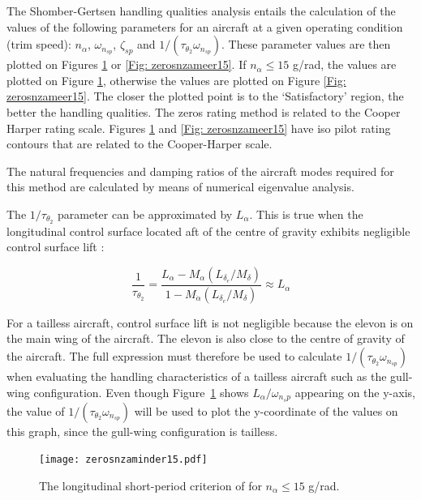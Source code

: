 \documentclass{report}
\begin{document}
The Shomber-Gertsen handling qualities analysis entails the calculation of the values of the following parameters for an aircraft at a given operating condition (trim speed):  $n_{\alpha}$, $\omega_{n_{sp}}$, $\zeta_{sp}$ and $1/(\tau_{\theta_2}\omega_{n_{sp}})$.  These parameter values are then plotted on Figures \ref{Fig: zerosnzaminder15} or \ref{Fig: zerosnzameer15}.  If $n_{\alpha} \le 15$ g/rad, the values are plotted on Figure \ref{Fig: zerosnzaminder15}, otherwise the values are plotted on Figure \ref{Fig: zerosnzameer15}.  The closer the plotted point is to the `Satisfactory' region, the better the handling qualities.  The zeros rating method is related to the Cooper Harper rating scale.  Figures \ref{Fig: zerosnzaminder15} and \ref{Fig: zerosnzameer15} have iso pilot rating contours that are related to the Cooper-Harper scale.

The natural frequencies and damping ratios of the aircraft modes required for this method are calculated by means of numerical eigenvalue analysis.

The $1/\tau_{\theta_2}$ parameter can be approximated by $L_\alpha$.  This is true when the longitudinal control surface located aft of the centre of gravity exhibits negligible control surface lift \citep{ZeroGertsen}:  

\begin{equation}
	\frac{1}{\tau_{\theta_2}} = \frac{L_\alpha - M_\alpha(L_{\delta_e}/M_\delta)}{1 - M_{\dot{\alpha}} (L_{\delta_e}/M_\delta)} \approx L_\alpha
\end{equation}

For a tailless aircraft, control surface lift is not negligible because the elevon is on the main wing of the aircraft.  The elevon is also close to the centre of gravity of the aircraft.  The full expression must therefore be used to calculate $1/(\tau_{\theta_2}\omega_{n_{sp}})$ when evaluating the handling characteristics of a tailless aircraft such as the gull-wing configuration.  Even though \mbox{Figure \ref{Fig: zerosnzaminder15}} shows $L_\alpha/\omega_{n_sp}$ appearing on the y-axis, the value of $1/(\tau_{\theta_2}\omega_{n_{sp}})$ will be used to plot the y-coordinate of the values on this graph, since the gull-wing configuration is tailless.

\begin{figure}[htb]
	\begin{center}
		\texttt{[image: zerosnzaminder15.pdf]}
	\end{center}
	\caption{The longitudinal short-period criterion of \cite{ZeroGertsen} for $n_{\alpha} \le 15$ g/rad.}
	\label{Fig: zerosnzaminder15}
\end{figure}
\end{document}
